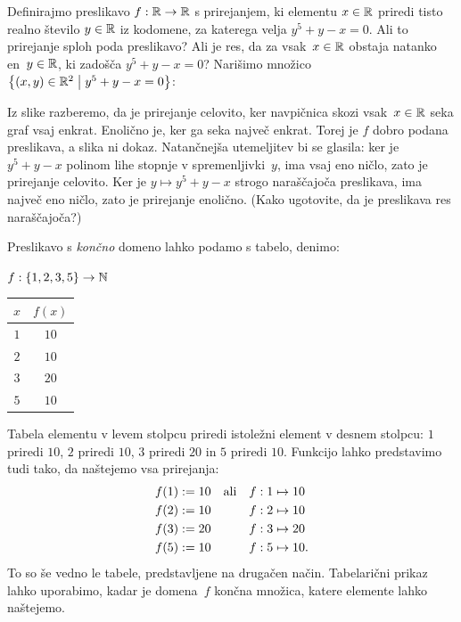 \begin{zgled}
  \label{zgled:prirejanje-opis}
  Definirajmo preslikavo $f : \mathbb{R} \to \mathbb{R}$ s prirejanjem, ki elementu $x \in \mathbb{R}$ priredi tisto realno število $y \in \mathbb{R}$ iz kodomene, za katerega velja $y^5 + y - x = 0$.
  Ali to prirejanje sploh poda preslikavo? Ali je res, da za vsak~$x \in \mathbb{R}$ obstaja natanko en~$y \in \mathbb{R}$, ki zadošča $y^5 + y - x = 0$?
  Narišimo množico $\left\{(x,y) \in \mathbb{R}^2 \; \middle| \; y^5 + y - x = 0\right\}$:
  \begin{center}
  \end{center}
  Iz slike razberemo, da je prirejanje celovito, ker navpičnica skozi vsak~$x \in \mathbb{R}$ seka graf vsaj enkrat.
  Enolično je, ker ga seka največ enkrat.
  Torej je $f$ dobro podana preslikava, a slika ni dokaz.
  Natančnejša utemeljitev bi se glasila: ker je $y^5 + y - x$ polinom lihe stopnje v spremenljivki~$y$, ima vsaj eno ničlo, zato je prirejanje celovito. Ker je $y \mapsto y^5 + y - x$ strogo naraščajoča preslikava, ima največ eno ničlo, zato je prirejanje enolično. (Kako ugotovite, da je preslikava res naraščajoča?)
\end{zgled}

Preslikavo s \emph{končno} domeno lahko podamo s tabelo, denimo:
%
\begin{center}
  $f : \left\{1, 2, 3, 5\right\} \to \mathbb{N}$

  \medskip

  \begin{tabular}{cc}
    \toprule
    $x$ & $f(x)$ \\ \midrule
    $1$ & $10$ \\ 
    $2$ & $10$ \\ 
    $3$ & $20$ \\ 
    $5$ & $10$ \\ \bottomrule
  \end{tabular}
\end{center}
%
Tabela elementu v levem stolpcu priredi istoležni element v desnem stolpcu: $1$ priredi $10$, $2$ priredi $10$, $3$ priredi $20$ in $5$ priredi $10$. Funkcijo lahko predstavimo tudi tako, da naštejemo vsa prirejanja:
%
\begin{align*}
  f(1) &\mathrel{{:}{=}} 10    &&\text{ali}&    f : 1 &\mapsto 10 \\
  f(2) &\mathrel{{:}{=}} 10    &&&    f : 2 &\mapsto 10 \\
  f(3) &\mathrel{{:}{=}} 20    &&&    f : 3 &\mapsto 20 \\
  f(5) &\mathrel{{:}{=}} 10    &&&    f : 5 &\mapsto 10.
\end{align*}
%
To so še vedno le tabele, predstavljene na drugačen način.
%
Tabelarični prikaz lahko uporabimo, kadar je domena~$f$ končna množica, katere elemente lahko naštejemo.

